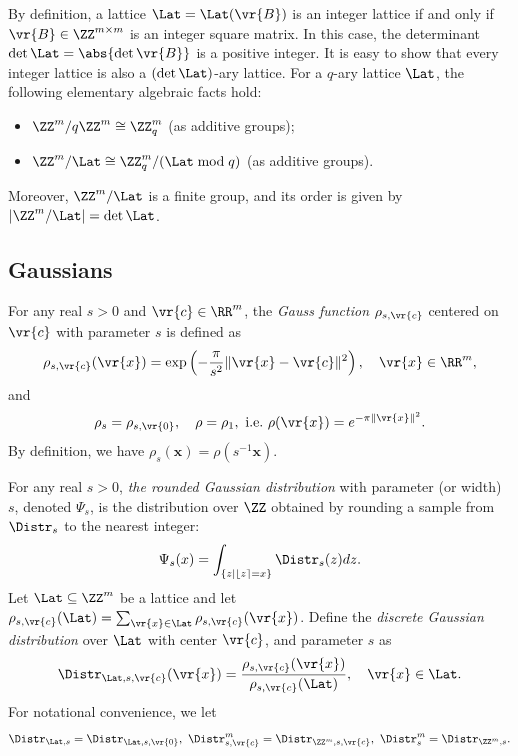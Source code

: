 \documentclass{fundam}
\begin{document}
By definition, a lattice $\Lat = \Lat(\vr{B})$ is an integer lattice if and only if $\vr{B} \in \ZZ^{m \times m}$ is an integer square matrix. In this case, the determinant $\det \Lat = \abs{\det{\vr{B}}}$ is a positive integer. It is easy to show that every integer lattice is also a $(\det \Lat)$-ary lattice. 
For a $q$-ary lattice $\Lat$, the following elementary algebraic facts hold:
\begin{itemize}
	\item $\ZZ^{m} / q\ZZ^{m} \cong \ZZ_q^m$ (as additive groups);
	\item $\ZZ^{m} / \Lat \cong \ZZ_q^m / (\Lat \bmod q)$ (as additive groups).
\end{itemize}
Moreover, $\ZZ^{m} / \Lat$ is a finite group, and its order is given by $|\ZZ^{m} / \Lat| = \det \Lat$.

\subsection{Gaussians}\label{Gaussian}
For any real $s>0$ and $\vr{c}\in\RR^{m}$, the \emph{Gauss function} $\rho_{s,\vr{c}}$ centered on $\vr{c}$ with parameter $s$ is defined as
\begin{align*}
	\rho_{s,\vr{c}}(\vr{x})  = \exp \left(-\frac{\pi}{s^{2}}\|\vr{x} - \vr{c} \|^{2}\right), ~~~\vr{x}\in\RR^{m},
\end{align*}
and 
\begin{align*}
	\rho_{s} = \rho_{s, \vr{0}}, ~~~\rho = \rho_{1},~\text{i.e.}~ \rho(\vr{x}) = e^{-\pi\| \vr{x} \|^{2}}.  
\end{align*}
By definition, we have $\rho_s(\mathbf{x}) = \rho(s^{-1} \mathbf{x})$.


For any real $s>0$, \textit{the rounded Gaussian distribution} with parameter (or width) $s$, denoted $\Psi_{s}$, is the distribution over $\ZZ$ obtained by rounding a sample from $\Distr_{s}$ to the nearest integer:
\begin{align*}
	\Psi_{s}(x)= \int_{\{ z\mid \lfloor z \rceil = x\}} \Distr_{s}(z)dz.
\end{align*}
%
Let $\Lat\subseteq \ZZ^{m}$ be a lattice and let $\rho_{s, \vr{c}} (\Lat) = \sum_{\vr{x}\in \Lat} \rho_{s, \vr{c}}(\vr{x})$. Define the \emph{discrete Gaussian distribution} over $\Lat$ with center $\vr{c}$, and parameter $s$ as
\begin{align*}
	\Distr_{\Lat, s, \vr{c}} (\vr{x}) =  \frac{\rho_{s, \vr{c}}(\vr{x})}{\rho_{s, \vr{c}}(\Lat)}, ~~~\vr{x}\in\Lat.
\end{align*}
For notational convenience, we let
\begin{align*}
	\Distr_{\Lat, s} = \Distr_{\Lat, s, \vr{0}}, ~ \Distr_{s, \vr{c}}^{m} = \Distr_{\ZZ^{m}, s, \vr{c}}, ~ \Distr_{s}^{m} = \Distr_{\ZZ^{m}, s}.
\end{align*}
\end{document}
